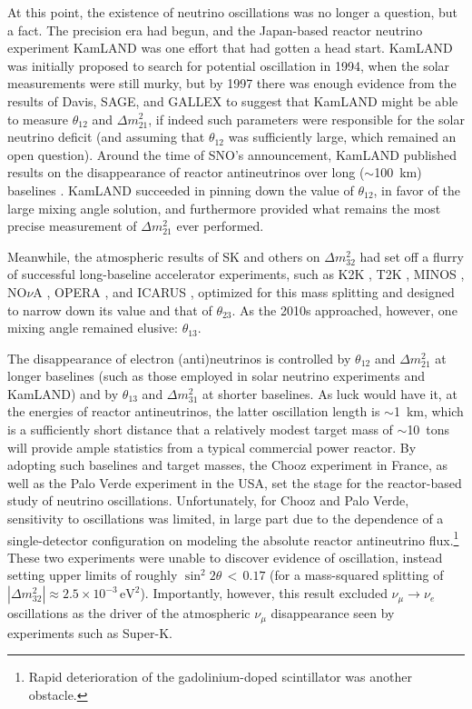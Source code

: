 \documentclass[../thesis.tex]{subfiles}
\begin{document}
At this point, the existence of neutrino oscillations was no longer a question, but a fact. The precision era had begun, and the Japan-based reactor neutrino experiment KamLAND was one effort that had gotten a head start. KamLAND was initially proposed to search for potential oscillation in 1994, when the solar measurements were still murky, but by 1997 there was enough evidence from the results of Davis, SAGE, and GALLEX to suggest that KamLAND might be able to measure $\theta_{12}$ and $\Delta m^2_{21}$, if indeed such parameters were responsible for the solar neutrino deficit (and assuming that $\theta_{12}$ was sufficiently large, which remained an open question). Around the time of SNO's announcement, KamLAND published results on the disappearance of reactor antineutrinos over long ($\sim$100~km) baselines \cite{PhysRevLett.90.021802}. KamLAND succeeded in pinning down the value of $\theta_{12}$, in favor of the large mixing angle solution, and furthermore provided what remains the most precise measurement of \(\Delta m^2_{21}\) ever performed.

Meanwhile, the atmospheric results of SK and others on \(\Delta m^2_{32}\) had set off a flurry of successful long-baseline accelerator experiments, such as K2K \cite{PhysRevD.74.072003}, T2K \cite{ABE2011106}, MINOS \cite{PhysRevLett.101.131802}, NO$\nu$A \cite{PhysRevLett.123.151803}, OPERA \cite{Agafonova_2012}, and ICARUS \cite{Rubbia_2011}, optimized for this mass splitting and designed to narrow down its value and that of $\theta_{23}$. As the 2010s approached, however, one mixing angle remained elusive: $\theta_{13}$.

The disappearance of electron (anti)neutrinos is controlled by $\theta_{12}$ and \(\Delta m^2_{21}\) at longer baselines (such as those employed in solar neutrino experiments and KamLAND) and by $\theta_{13}$ and \(\Delta m^2_{31}\) at shorter baselines. As luck would have it, at the energies of reactor antineutrinos, the latter oscillation length is $\sim$1~km, which is a sufficiently short distance that a relatively modest target mass of $\sim$10~tons will provide ample statistics from a typical commercial power reactor. By adopting such baselines and target masses, the Chooz experiment in France, as well as the Palo Verde experiment in the USA, set the stage for the reactor-based study of neutrino oscillations. Unfortunately, for Chooz and Palo Verde, sensitivity to oscillations was limited, in large part due to the dependence of a single-detector configuration on modeling the absolute reactor antineutrino flux.\footnote{Rapid deterioration of the gadolinium-doped scintillator was another obstacle.} These two experiments were unable to discover evidence of oscillation, instead setting upper limits of roughly $\sin^2 2\theta\,<\,0.17$ (for a mass-squared splitting of $|\Delta m^2_{32}| \approx 2.5\times10^{-3}\,\text{eV}^2$). Importantly, however, this result excluded $\nu_\mu \rightarrow \nu_e$ oscillations as the driver of the atmospheric $\nu_\mu$ disappearance seen by experiments such as Super-K.
\end{document}
